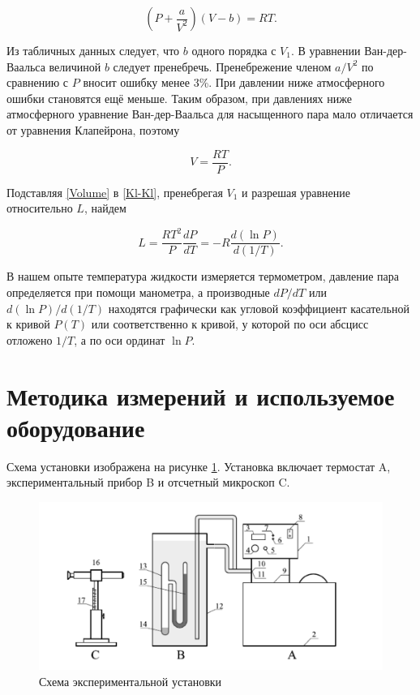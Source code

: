 \documentclass[a4paper, 12pt]{article}
\begin{document}
    \begin{equation}
        \label{VDV}
        \left(P+\frac{a}{V^2}\right)\left(V-b\right)=RT.
    \end{equation}

    \noindent Из табличных данных следует, что $b$ одного порядка с $V_1$. В уравнении Ван-дер-Ваальса величиной $b$ следует пренебречь. Пренебрежение членом $a/V^2$ по сравнению с $P$ вносит ошибку менее 3\%. При давлении ниже атмосферного ошибки становятся ещё меньше. Таким образом, при давлениях ниже атмосферного уравнение Ван-дер-Ваальса для насыщенного пара мало отличается от уравнения Клапейрона, поэтому

    \begin{equation}
        \label{Volume}
        V=\frac{RT}{P}.
    \end{equation}

    \noindent Подставляя \eqref{Volume} в \eqref{Kl-Kl}, пренебрегая $V_1$ и разрешая уравнение относительно $L$, найдем

    \begin{equation}
        \label{final}
        L=\frac{RT^2}{P}\frac{dP}{dT}=-R\frac{d(\ln P)}{d(1/T)}.
    \end{equation}

    \noindent В нашем опыте температура жидкости измеряется термометром, давление пара определяется при помощи манометра, а производные $dP/dT$ или $d(\ln P)/d(1/T)$ находятся графически как угловой коэффициент касательной к кривой $P(T)$ или соответственно к кривой, у которой по оси абсцисс отложено $1/T$, а по оси ординат $\ln P$.
    
    \section*{Методика измерений и используемое оборудование}

    \noindent Схема установки изображена на рисунке \ref{installation}. Установка включает термостат A, экспериментальный прибор B и отсчетный микроскоп C. \\

     \begin{figure}[H]
        \centering
        \includegraphics[width = 15cm]{images/installation.png}
        \caption{Схема экспериментальной установки}
        \label{installation}
    \end{figure}
\end{document}
